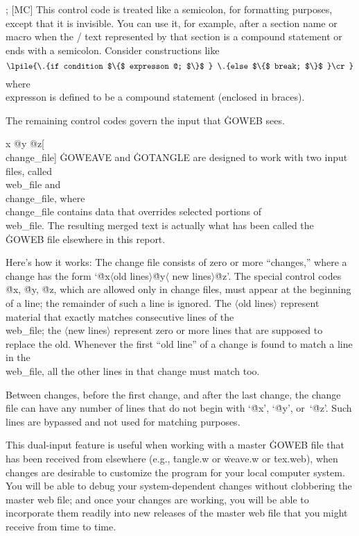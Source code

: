 \@; [MC] This control code is treated like a semicolon, for formatting
purposes, except that it is invisible. You can use it, for example, after
a section name or macro when the \GO/ text represented by that section
is a compound statement or ends
with a semicolon. Consider constructions like
$$\lpile{\.{if condition $\{$ expresson @; $\}$  } 
\.{else $\{$ break; $\}$ }\cr}$$
where \\{expresson} is defined to be a compound statement (enclosed in braces).

\subsec
The remaining control codes govern the input that \.{GOWEB} sees.

\@{x @y @z}[\\{change\_file}]
\.{GOWEAVE} and \.{GOTANGLE} are designed to work with two input files,
called \\{web\_file} and \\{change\_file}, where \\{change\_file} contains
data that overrides selected portions of \\{web\_file}. The resulting merged
text is actually what has been called the \.{GOWEB} file elsewhere in this
report.

\more Here's how it works: The change file consists of zero or more ``changes,''
where a change has the form `\.{@x}$\langle$old lines$\rangle$\.{@y}$\langle$%
new lines$\rangle$\.{@z}'. The special control codes \.{@x}, \.{@y}, \.{@z},
which are allowed only in change files, must appear at the beginning of a line;
the remainder of such a line is ignored.
The $\langle$old lines$\rangle$ represent material that exactly matches
consecutive lines of the \\{web\_file}; the $\langle$new lines$\rangle$
represent zero or more lines that are supposed to replace the old. Whenever
the first ``old line'' of a change is found to match a line in the
\\{web\_file}, all the other lines in that change must match too.

\more Between changes, before the first change, and after the last change,
the change file can have any number of lines that do not begin with
`\.{@x}', `\.{@y}', or~`\.{@z}'. Such lines are bypassed and not used for
matching purposes.

\more This dual-input feature is useful when working with a master \.{GOWEB}
file that has been received from elsewhere (e.g., \.{tangle.w} or
\.{weave.w} or \.{tex.web}), when changes are desirable to customize the
program for your local computer system. You will be able to debug your
system-dependent changes without clobbering the master web file; and once
your changes are working, you will be able to incorporate them readily
into new releases of the master web file that you might receive from time
to time.

